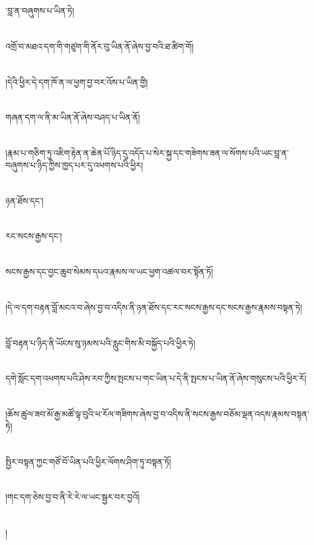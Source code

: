 ་བླ་ན་བཞུགས་པ་ཡིན་ཏེ།\chapter{ }འགྲོ་བ་མཐའ་དག་གི་གཙུག་གི་ནོར་བུ་ཡིན་ནོ་ཞེས་བྱ་བའི་ཐ་ཚིག་གོ།\chapter{ }།དེའི་ཕྱིར་དེ་དག་ཁོ་ན་ལ་ཕྱག་བྱ་བར་འོས་པ་ཡིན་གྱི།\chapter{ }གཞན་དག་ལ་ནི་མ་ཡིན་ནོ་ཞེས་བཤད་པ་ཡིན་ནོ།\chapter{ }།རྣམ་པ་གཅིག་ཏུ་འཇིག་རྟེན་ན་ཆེན་པོ་ཉིད་དུ་འདོད་པ་སེར་སྐྱ་དང་གཟེགས་ཟན་ལ་སོགས་པའི་ཡང་བླ་ན་བཞུགས་པ་ཉིད་ཀྱིས་ཁྱད་པར་དུ་འཕགས་པའི་ཕྱིར།\chapter{ }ཉན་ཐོས་དང་།\chapter{ }རང་སངས་རྒྱས་དང་།\chapter{ }སངས་རྒྱས་དང་བྱང་ཆུབ་སེམས་དཔའ་རྣམས་ལ་ཡང་ཕྱག་འཚལ་བར་སྟོན་ཏོ།\chapter{ }།དེ་ལ་དག་བརྟན་བློ་མངའ་བ་ཞེས་བྱ་བ་འདིས་ནི་ཉན་ཐོས་དང་རང་སངས་རྒྱས་དང་སངས་རྒྱས་རྣམས་བསྟན་ཏེ།\chapter{ }བློ་བརྟན་པ་ཉིད་ནི་ཡོངས་སུ་ཉམས་པའི་རླུང་གིས་མི་བསྐྱོད་པའི་ཕྱིར་ཏེ།\chapter{ }དགེ་སློང་དག་འཕགས་པའི་ཤེས་རབ་ཀྱིས་སྤངས་པ་གང་ཡིན་པ་དེ་ནི་སྤངས་པ་ཡིན་ནོ་ཞེས་གསུངས་པའི་ཕྱིར་རོ།\chapter{ }།ཆོས་ཚུལ་ཟབ་མོ་རྒྱ་མཚོ་ལྟ་བུའི་ཕ་རོལ་གཟིགས་ཞེས་བྱ་བ་འདིས་ནི་སངས་རྒྱས་བཅོམ་ལྡན་འདས་རྣམས་བསྟན་ཏེ།\chapter{ }སྤྱིར་བསྟན་ཀྱང་གཙོ་བོ་ཡིན་པའི་ཕྱིར་ལོགས་ཤིག་ཏུ་བསྟན་ཏོ།\chapter{ }།གང་དག་ཅེས་བྱ་བ་ནི་རེ་རེ་ལ་ཡང་སྦྱར་བར་བྱའོ།\chapter{ }།
